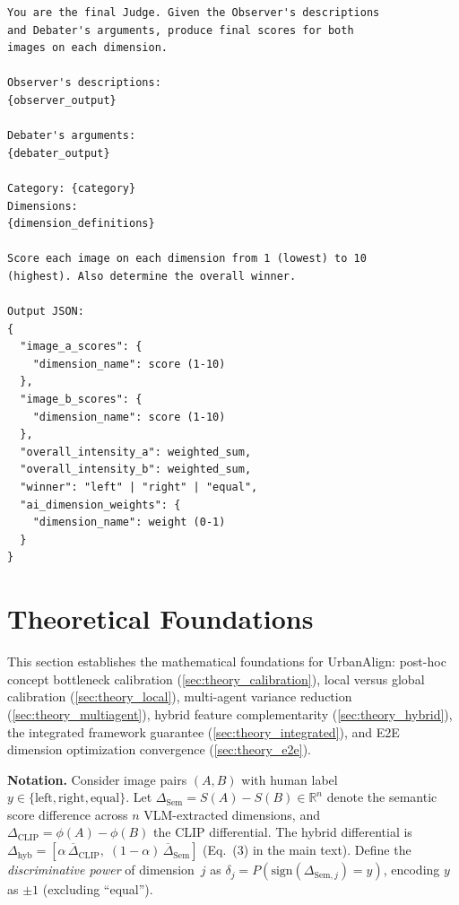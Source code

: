 \documentclass[runningheads]{llncs}
\begin{document}
\begin{lstlisting}[caption={Judge agent prompt (Stage 2, Mode 4).}]
You are the final Judge. Given the Observer's descriptions
and Debater's arguments, produce final scores for both
images on each dimension.

Observer's descriptions:
{observer_output}

Debater's arguments:
{debater_output}

Category: {category}
Dimensions:
{dimension_definitions}

Score each image on each dimension from 1 (lowest) to 10
(highest). Also determine the overall winner.

Output JSON:
{
  "image_a_scores": {
    "dimension_name": score (1-10)
  },
  "image_b_scores": {
    "dimension_name": score (1-10)
  },
  "overall_intensity_a": weighted_sum,
  "overall_intensity_b": weighted_sum,
  "winner": "left" | "right" | "equal",
  "ai_dimension_weights": {
    "dimension_name": weight (0-1)
  }
}
\end{lstlisting}

\FloatBarrier
\section{Theoretical Foundations}
\label{sec:theory}

This section establishes the mathematical foundations for UrbanAlign: post-hoc concept bottleneck calibration (\cref{sec:theory_calibration}), local versus global calibration (\cref{sec:theory_local}), multi-agent variance reduction (\cref{sec:theory_multiagent}), hybrid feature complementarity (\cref{sec:theory_hybrid}), the integrated framework guarantee (\cref{sec:theory_integrated}), and E2E dimension optimization convergence (\cref{sec:theory_e2e}).

\smallskip\noindent\textbf{Notation.}
Consider image pairs $(A,B)$ with human label $y \in \{\text{left},\text{right},\text{equal}\}$.
Let $\Delta_{\text{Sem}} = S(A){-}S(B) \in \mathbb{R}^n$ denote the semantic score difference across $n$ VLM-extracted dimensions, and $\Delta_{\text{CLIP}} = \phi(A){-}\phi(B)$ the CLIP differential.
The hybrid differential is $\Delta_{\text{hyb}} = [\alpha\,\overline{\Delta}_{\text{CLIP}},\;(1{-}\alpha)\,\overline{\Delta}_{\text{Sem}}]$ (Eq.~(3) in the main text).
Define the \emph{discriminative power} of dimension~$j$ as $\delta_j = P(\mathrm{sign}(\Delta_{\text{Sem},j}) = y)$, encoding $y$ as $\pm 1$ (excluding ``equal'').
\end{document}
